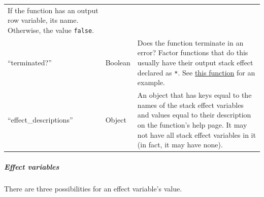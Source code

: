 \documentclass[
]{article}
\begin{document}
\begin{longtable}[]{@{}lll@{}}
\begin{minipage}[t]{0.78\columnwidth}
If the function has an output row variable, its name. Otherwise, the
value \texttt{false}.\strut
\end{minipage}\tabularnewline
\begin{minipage}[t]{0.07\columnwidth}\raggedright
``terminated?''\strut
\end{minipage} & \begin{minipage}[t]{0.06\columnwidth}\raggedright
Boolean\strut
\end{minipage} & \begin{minipage}[t]{0.78\columnwidth}\raggedright
Does the function terminate in an error? Factor functions that do this
usually have their output stack effect declared as \texttt{*}. See
\href{https://docs.factorcode.org/content/word-decode-error\%2Cio.encodings.html}{this
function} for an example.\strut
\end{minipage}\tabularnewline
\begin{minipage}[t]{0.07\columnwidth}\raggedright
``effect\_descriptions''\strut
\end{minipage} & \begin{minipage}[t]{0.06\columnwidth}\raggedright
Object\strut
\end{minipage} & \begin{minipage}[t]{0.78\columnwidth}\raggedright
An object that has keys equal to the names of the stack effect variables
and values equal to their description on the function's help page. It
may not have all stack effect variables in it (in fact, it may have
none).\strut
\end{minipage}\tabularnewline
\bottomrule
\end{longtable}

\hypertarget{effect-variables}{%
\subparagraph{Effect variables}\label{effect-variables}}

There are three possibilities for an effect variable's value.
\end{document}
